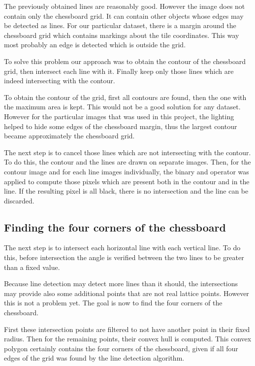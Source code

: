\documentclass[conference]{IEEEtran}
\begin{document}
The previously obtained lines are reasonably good. However the image does not contain only the chessboard grid. It can contain other objects whose edges may be detected as lines. For our particular dataset, there is a margin around the chessboard grid which contains markings about the tile coordinates. This way most probably an edge is detected which is outside the grid.

To solve this problem our approach was to obtain the contour of the chessboard grid, then intersect each line with it. Finally keep only those lines which are indeed intersecting with the contour. 

To obtain the contour of the grid, first all contours are found, then the one with the maximum area is kept. This would not be a good solution for any dataset. However for the particular images that was used in this project, the lighting helped to hide some edges of the chessboard margin, thus the largest contour became approximately the chessboard grid.

The next step is to cancel those lines which are not intersecting with the contour. To do this, the contour and the lines are drawn on separate images. Then, for the contour image and for each line images individually, the binary and operator was applied to compute those pixels which are present both in the contour and in the line. If the resulting pixel is all black, there is no intersection and the line can be discarded.

\subsection{Finding the four corners of the chessboard}

The next step is to intersect each horizontal line with each vertical line. To do this, before intersection the angle is verified between the two lines to be greater than a fixed value.

Because line detection may detect more lines than it should, the intersections may provide also some additional points that are not real lattice points. However this is not a problem yet. The goal is now to find the four corners of the chessboard.

First these intersection points are filtered to not have another point in their fixed radius. Then for the remaining points, their convex hull is computed. This convex polygon certainly contains the four corners of the chessboard, given if all four edges of the grid was found by the line detection algorithm.
\end{document}
